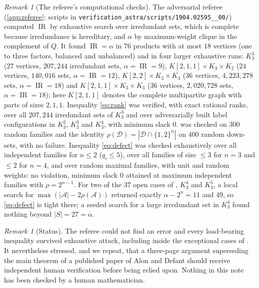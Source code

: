 \documentclass[11pt,a4paper]{article}
\theoremstyle{plain}
\theoremstyle{definition}
\theoremstyle{remark}
\newtheorem{remark}[theorem]{Remark}
\newcommand{\IR}{\operatorname{IR}}
\newcommand{\cA}{\mathcal A}
\newcommand{\cD}{\mathcal D}
\newcommand{\rk}{\rho}
\newcommand{\Kmp}[1]{K[#1]}
\begin{document}
\begin{remark}[The referee's computational checks]\label{rem:computation}
The adversarial referee (\cref{app:referee}; scripts in \nolinkurl{verification_astra/scripts/1904.02595__00/}) computed $\IR$ by exhaustive search over irredundant sets, which is complete because irredundance is hereditary, and $\alpha$ by maximum-weight clique in the complement of $Q$. It found $\IR=\alpha$ in $76$ products with at most $18$ vertices (one to three factors, balanced and unbalanced) and in four larger exhaustive runs: $K_3^3$ ($27$ vertices, $207{,}244$ irredundant sets, $\alpha=\IR=9$), $\Kmp{2,1,1}\times K_3\times K_2$ ($24$ vertices, $140{,}016$ sets, $\alpha=\IR=12$), $\Kmp{2,2}\times K_3\times K_3$ ($36$ vertices, $4{,}223{,}278$ sets, $\alpha=\IR=18$) and $\Kmp{2,1,1}\times K_3\times K_3$ ($36$ vertices, $2{,}020{,}728$ sets, $\alpha=\IR=18$); here $\Kmp{2,1,1}$ denotes the complete multipartite graph with parts of sizes $2,1,1$. Inequality \eqref{eq:rank} was verified, with exact rational ranks, over all $207{,}244$ irredundant sets of $K_3^3$ and over adversarially built label configurations in $K_3^2$, $K_3^3$ and $K_3^4$, with minimum slack $0$.  was checked on $300$ random families and the identity $\rk(\cD)=|\cD\cap\{1,2\}^n|$ on $400$ random down-sets, with no failure. Inequality \eqref{eq:defect} was checked exhaustively over all independent families for $n\le2$ ($q_i\le5$), over all families of size $\le3$ for $n=3$ and $\le2$ for $n=4$, and over random maximal families, with unit and random weights: no violation, minimum slack $0$ attained at maximum independent families with $\rk=2^{n-1}$. For two of the $37$ open cases of \cite{AD20}, $K_3^4$ and $K_3^5$, a local search for $\max(|\cA|-2\rk(\cA))$ returned exactly $\alpha-2^n=11$ and $49$, so \eqref{eq:defect} is tight there; a seeded search for a large irredundant set in $K_3^4$ found nothing beyond $|S|=27=\alpha$.
\end{remark}

\begin{remark}[Status]\label{rem:status}
The referee could not find an error and every load-bearing inequality survived exhaustive attack, including inside the exceptional cases of \cite{AD20}. It nevertheless stressed, and we repeat, that a three-page argument superseding the main theorem of a published paper of Alon and Defant should receive independent human verification before being relied upon. Nothing in this note has been checked by a human mathematician.
\end{remark}
\end{document}
